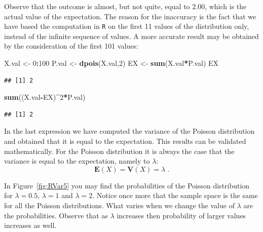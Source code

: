 \documentclass[
]{krantz}
\makeatletter
\newenvironment{Shaded}{\begin{snugshade}}{\end{snugshade}}
\newcommand{\DecValTok}[1]{\textcolor[rgb]{0.00,0.00,0.81}{#1}}
\newcommand{\KeywordTok}[1]{\textcolor[rgb]{0.13,0.29,0.53}{\textbf{#1}}}
\newcommand{\NormalTok}[1]{#1}
\newcommand{\OperatorTok}[1]{\textcolor[rgb]{0.81,0.36,0.00}{\textbf{#1}}}
\newcommand{\StringTok}[1]{\textcolor[rgb]{0.31,0.60,0.02}{#1}}
\newcommand{\Expec}{\mathbf{E}}
\newcommand{\Var}{\mathbf{V}}
\newenvironment{kframe}{%
\medskip{}
\setlength{\fboxsep}{.8em}
 \def\at@end@of@kframe{}%
 \ifinner\ifhmode%
  \def\at@end@of@kframe{\end{minipage}}%
  \begin{minipage}{\columnwidth}%
 \fi\fi%
 \def\FrameCommand##1{\hskip\@totalleftmargin \hskip-\fboxsep
 \colorbox{shadecolor}{##1}\hskip-\fboxsep
     \hskip-\linewidth \hskip-\@totalleftmargin \hskip\columnwidth}%
 \MakeFramed {\advance\hsize-\width
   \@totalleftmargin\z@ \linewidth\hsize
   \@setminipage}}%
 {\par\unskip\endMakeFramed%
 \at@end@of@kframe}
\renewenvironment{Shaded}{\begin{kframe}}{\end{kframe}}
\theoremstyle{definition}
\theoremstyle{definition}
\theoremstyle{definition}
\theoremstyle{remark}
\makeatother
\begin{document}
Observe that the outcome is almost, but not quite, equal to \(2.00\),
which is the actual value of the expectation. The reason for the
inaccuracy is the fact that we have based the computation in \texttt{R} on the
first 11 values of the distribution only, instead of the infinite
sequence of values. A more accurate result may be obtained by the
consideration of the first 101 values:

\begin{Shaded}
\begin{Highlighting}[]
\NormalTok{X.val <-}\StringTok{ }\DecValTok{0}\OperatorTok{:}\DecValTok{100}
\NormalTok{P.val <-}\StringTok{ }\KeywordTok{dpois}\NormalTok{(X.val,}\DecValTok{2}\NormalTok{)}
\NormalTok{EX <-}\StringTok{ }\KeywordTok{sum}\NormalTok{(X.val}\OperatorTok{*}\NormalTok{P.val)}
\NormalTok{EX}
\end{Highlighting}
\end{Shaded}

\begin{verbatim}
## [1] 2
\end{verbatim}

\begin{Shaded}
\begin{Highlighting}[]
\KeywordTok{sum}\NormalTok{((X.val}\OperatorTok{-}\NormalTok{EX)}\OperatorTok{^}\DecValTok{2}\OperatorTok{*}\NormalTok{P.val)}
\end{Highlighting}
\end{Shaded}

\begin{verbatim}
## [1] 2
\end{verbatim}

In the last expression we have computed the variance of the Poisson
distribution and obtained that it is equal to the expectation. This
results can be validated mathematically. For the Poisson distribution it
is always the case that the variance is equal to the expectation, namely
to \(\lambda\): \[\Expec(X) = \Var(X) = \lambda\;.\]

In Figure~\ref{fig:RVar5} you may find the probabilities of the
Poisson distribution for \(\lambda = 0.5\), \(\lambda = 1\) and
\(\lambda = 2\). Notice once more that the sample space is the same for
all the Poisson distributions. What varies when we change the value of
\(\lambda\) are the probabilities. Observe that as \(\lambda\) increases
then probability of larger values increases as well.
\end{document}

